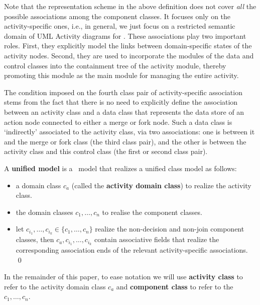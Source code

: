 Note that the representation scheme in the above definition does not cover \textit{all} the possible associations among the component classes. It focuses only on the activity-specific ones, i.e., in general, we just focus on a restricted semantic domain of UML Activity diagrams for \agl. %
%
These associations play two important roles. First, they explicitly model the links between domain-specific states of the activity nodes. Second, they are used to incorporate the modules of the data and control classes into the containment tree of the activity module, thereby promoting this module as the main module for managing the entire activity.

The condition imposed on the fourth class pair of activity-specific association stems from the fact that there is no need to explicitly define the association between an activity class and a data class that represents the data store of an action node connected to either a merge or fork node. Such a data class is `indirectly' associated to the activity class, via two associations: one is between it and the merge or fork class (the third class pair), and the other is between the activity class and this control class (the first or second class pair).

\begin{definition} \label{def:unified-model}
	A \textbf{unified model} is a \dcsl~model that realizes a unified class model as follows:
	\begin{itemize}%
		\item a domain class $ c_a $ (called the \textbf{activity domain class}) to realize the activity class.
		\item the domain classes $ c_1,\dots,c_n $ to realise the component classes.
		\item let $ c_{i_1},\dots,c_{i_k} \in \{c_1,\dots,c_n\} $ realize the non-decision and non-join component classes, then $ c_a,c_{i_1},\dots,c_{i_k} $ contain associative fields that realize the corresponding association ends of the relevant activity-specific associations. \qed
	\end{itemize}
\end{definition}

In the remainder of this paper, to ease notation we will use \textbf{activity class} to refer to the activity domain class $ c_a $ and \textbf{component class} to refer to the $ c_1,\dots,c_n $. 

